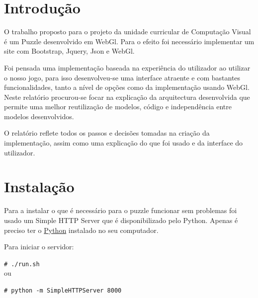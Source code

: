 \documentclass[pdftex,12pt,a4paper]{report}
\newcommand{\shellcmd}[1]{\indent\indent\texttt{\footnotesize\# #1}\\}
\begin{document}
\renewcommand{\headrulewidth}{0pt}

\fancyhead{}
\fancyfoot{}
\rfoot{\thepage}

\renewcommand*\contentsname{Conteúdos}
\renewcommand*\figurename{Figura}
\renewcommand*\tablename{Tabela}

\tableofcontents
\renewcommand{\headrulewidth}{0.15pt}
\renewcommand{\thechapter}{}

\clearpage

\section{Introdução}
O trabalho proposto para o projeto da unidade curricular de Computação Visual é um Puzzle desenvolvido em WebGl. Para o efeito foi necessário implementar um site com Bootstrap, Jquery, Json e WebGl.

Foi pensada uma implementação baseada na experiência do utilizador ao utilizar o nosso jogo, para isso desenvolveu-se uma interface atraente e com bastantes funcionalidades, tanto a nível de opções como da implementação usando WebGl. Neste relatório procurou-se focar na explicação da arquitectura desenvolvida que permite uma melhor reutilização de modelos, código e independência entre modelos desenvolvidos.

O relatório reflete todos os passos e decisões tomadas na criação da implementação, assim como uma explicação do que foi usado e da interface do utilizador.

\clearpage

\section{Instalação}

Para a instalar o que é necessário para o puzzle funcionar sem problemas foi usado um Simple HTTP Server que é disponibilizado pelo Python. Apenas é preciso ter o \href{https://www.python.org/downloads/}{Python} instalado no seu computador.

Para iniciar o servidor:

\shellcmd{./run.sh}

ou

\shellcmd{python -m SimpleHTTPServer 8000}
\end{document}
